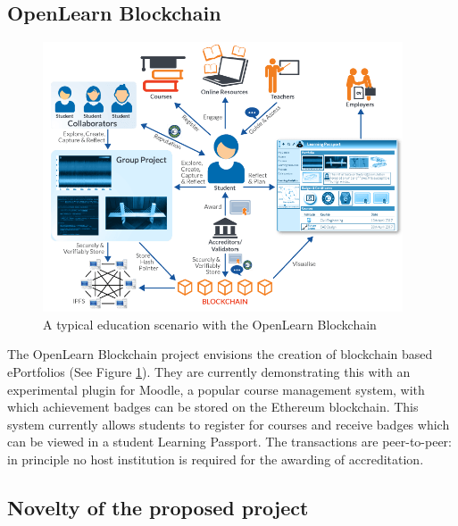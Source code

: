 \subsection{OpenLearn Blockchain}%

\begin{figure}[!ht] 
    \centering    
    \includegraphics[width=0.95\textwidth]{openlearn}
    \caption[OpenLearn Blockchain scenario]
        {A typical education scenario with the OpenLearn Blockchain\citep{openlearn2018}}
    \label{fig:openlearn}
\end{figure}

The OpenLearn Blockchain project envisions the creation of blockchain based ePortfolios (See Figure 
\ref{fig:openlearn}). They are currently demonstrating this with an experimental plugin for Moodle, 
a popular course management system, with which achievement badges can be stored on the Ethereum 
blockchain. This system currently allows students to register for courses and receive badges which 
can be viewed in a student Learning Passport. The transactions are peer-to-peer: in principle no 
host institution is required for the awarding of accreditation. \citep{sharples2016blockchain}

\subsection{Novelty of the proposed project}

